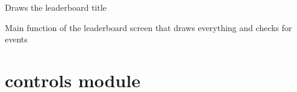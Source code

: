 \documentclass[letterpaper,10pt,english]{sphinxmanual}
\begin{document}
\begin{fulllineitems}
\begin{fulllineitems}
\label{\detokenize{leaderboard:leaderboard.Leaderboard.draw_title}}
\pysigstartsignatures
{}
\pysigstopsignatures
\sphinxAtStartPar
Draws the leaderboard title

\end{fulllineitems}


\begin{fulllineitems}
\label{\detokenize{leaderboard:leaderboard.Leaderboard.main}}
\pysigstartsignatures
{}
\pysigstopsignatures
\sphinxAtStartPar
Main function of the leaderboard screen that draws everything and checks for events

\end{fulllineitems}


\end{fulllineitems}


\sphinxstepscope


\chapter{controls module}
\label{\detokenize{controls:module-controls}}\label{\detokenize{controls:controls-module}}\label{\detokenize{controls::doc}}
\end{document}
